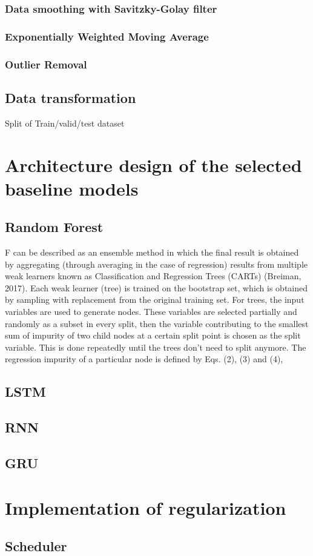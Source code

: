 \subsubsection{Data smoothing with Savitzky-Golay filter}
\subsubsection{Exponentially Weighted Moving Average}
\subsubsection{Outlier Removal}
\subsection{Data transformation}
Split of Train/valid/test dataset 
\section{Architecture design of the selected baseline models}
\subsection{Random Forest}
F can be described as an ensemble method in which the final result is obtained by aggregating (through averaging in the case of regression) results from multiple weak learners known as Classification and Regression Trees (CARTs) (Breiman, 2017). Each weak learner (tree) is trained on the bootstrap set, which is obtained by sampling with replacement from the original training set. For trees, the input variables are used to generate nodes. These variables are selected partially and randomly as a subset in every split, then the variable contributing to the smallest sum of impurity of two child nodes at a certain split point is chosen as the split variable. This is done repeatedly until the trees don't need to split anymore. The regression impurity of a particular node is defined by Eqs. (2), (3) and (4), \citep{wangMachineLearningFramework2021}
\subsection{LSTM}

\subsection{RNN}

\subsection{GRU}

\section{Implementation of regularization}

\subsection{Scheduler}

